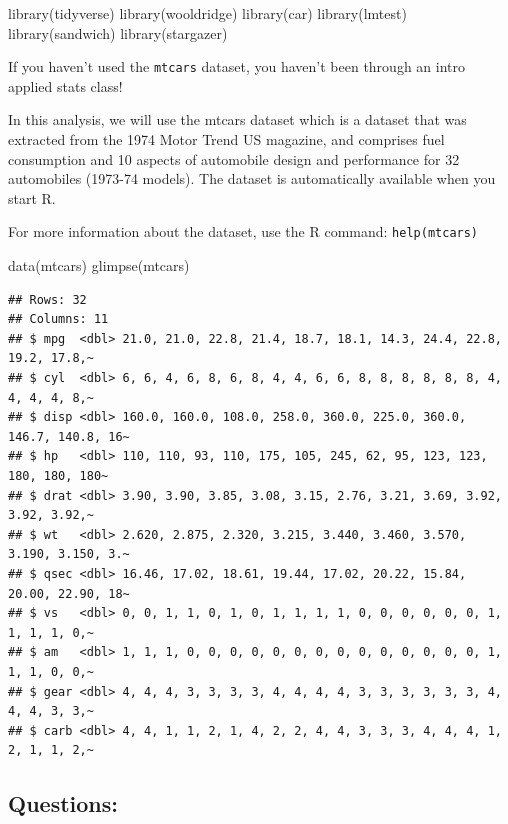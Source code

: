 \documentclass[
]{book}
\newenvironment{Shaded}{\begin{snugshade}}{\end{snugshade}}
\newcommand{\FunctionTok}[1]{\textcolor[rgb]{0.00,0.00,0.00}{#1}}
\newcommand{\NormalTok}[1]{#1}
\theoremstyle{definition}
\theoremstyle{definition}
\theoremstyle{definition}
\theoremstyle{definition}
\theoremstyle{remark}
\begin{document}
\begin{Shaded}
\begin{Highlighting}[]
\FunctionTok{library}\NormalTok{(tidyverse)}
\FunctionTok{library}\NormalTok{(wooldridge)}
\FunctionTok{library}\NormalTok{(car)}
\FunctionTok{library}\NormalTok{(lmtest)}
\FunctionTok{library}\NormalTok{(sandwich)}
\FunctionTok{library}\NormalTok{(stargazer)}
\end{Highlighting}
\end{Shaded}

If you haven't used the \texttt{mtcars} dataset, you haven't been through an intro applied stats class!

In this analysis, we will use the mtcars dataset which is a dataset that was extracted from the 1974 Motor Trend US magazine, and comprises fuel consumption and 10 aspects of automobile design and performance for 32 automobiles (1973-74 models). The dataset is automatically available when you start R.

For more information about the dataset, use the R command: \texttt{help(mtcars)}

\begin{Shaded}
\begin{Highlighting}[]
\FunctionTok{data}\NormalTok{(mtcars)}
\FunctionTok{glimpse}\NormalTok{(mtcars)}
\end{Highlighting}
\end{Shaded}

\begin{verbatim}
## Rows: 32
## Columns: 11
## $ mpg  <dbl> 21.0, 21.0, 22.8, 21.4, 18.7, 18.1, 14.3, 24.4, 22.8, 19.2, 17.8,~
## $ cyl  <dbl> 6, 6, 4, 6, 8, 6, 8, 4, 4, 6, 6, 8, 8, 8, 8, 8, 8, 4, 4, 4, 4, 8,~
## $ disp <dbl> 160.0, 160.0, 108.0, 258.0, 360.0, 225.0, 360.0, 146.7, 140.8, 16~
## $ hp   <dbl> 110, 110, 93, 110, 175, 105, 245, 62, 95, 123, 123, 180, 180, 180~
## $ drat <dbl> 3.90, 3.90, 3.85, 3.08, 3.15, 2.76, 3.21, 3.69, 3.92, 3.92, 3.92,~
## $ wt   <dbl> 2.620, 2.875, 2.320, 3.215, 3.440, 3.460, 3.570, 3.190, 3.150, 3.~
## $ qsec <dbl> 16.46, 17.02, 18.61, 19.44, 17.02, 20.22, 15.84, 20.00, 22.90, 18~
## $ vs   <dbl> 0, 0, 1, 1, 0, 1, 0, 1, 1, 1, 1, 0, 0, 0, 0, 0, 0, 1, 1, 1, 1, 0,~
## $ am   <dbl> 1, 1, 1, 0, 0, 0, 0, 0, 0, 0, 0, 0, 0, 0, 0, 0, 0, 1, 1, 1, 0, 0,~
## $ gear <dbl> 4, 4, 4, 3, 3, 3, 3, 4, 4, 4, 4, 3, 3, 3, 3, 3, 3, 4, 4, 4, 3, 3,~
## $ carb <dbl> 4, 4, 1, 1, 2, 1, 4, 2, 2, 4, 4, 3, 3, 3, 4, 4, 4, 1, 2, 1, 1, 2,~
\end{verbatim}

\hypertarget{questions-1}{%
\subsection{Questions:}\label{questions-1}}
\end{document}
